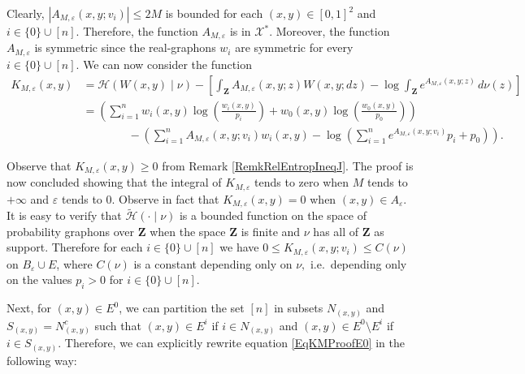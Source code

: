 \documentclass[12pt,twoside,a4paper]{article}
\newcommand{\Space}{\mathbf{Z}}
\newcommand{\Ugo}{\mathcal{X}^*}
\begin{document}
Clearly, $|A_{M,\varepsilon}(x,y;v_i)|\leq 2M$ is bounded for each $(x,y)\in [0,1]^2$ and $i\in \{0\}\cup [n].$  Therefore, the function $A_{M,\varepsilon}$ is in $\Ugo$. Moreover, the function $A_{M,\varepsilon}$ is symmetric since the real-graphons $w_i$ are symmetric for every $i\in \{0\}\cup [n].$ We can now consider the function 
\begin{equation}\label{EqKMProofE0}
\begin{aligned}
    K_{M,\varepsilon}(x,y) &= \mathcal{H}(W(x,y) \mid \nu) - \left[ \int_{\Space} A_{M,\varepsilon}(x,y;z) W(x,y;dz) - \log \int_\Space e^{A_{M,\varepsilon}(x,y;z)} \, d\nu(z) \right]\\
    &=\left(\sum^n_{i=1} w_i(x,y) \log \left(\frac{w_i(x,y)}{p_i}\right)+w_0(x,y)\log\left(\frac{w_0(x,y)}{p_0}\right)\right)\\
    &\qquad \qquad -\left(\sum^n_{i=1}A_{M,\varepsilon}(x,y;v_i)w_i(x,y)-\log(\sum^n_{i=1}e^{A_{M,\varepsilon}(x,y;v_i)}p_i+p_0)\right).
\end{aligned}
\end{equation}

Observe that $K_{M,\varepsilon}(x,y)\geq 0$ from Remark \ref{RemkRelEntropIneqJ}.
The proof is now concluded showing that the integral of $K_{M,\varepsilon}$ tends to zero when $M$ tends to $+\infty$ and $\varepsilon$ tends to $0.$ 
Observe in fact that $K_{M,\varepsilon}(x,y)=0$ when $(x,y)\in A_{\varepsilon}.$ It is easy to verify that $\widetilde{\mathcal{H}}(\cdot \mid \nu)$ is a bounded function on the space of probability graphons over $\Space$ when the space $\Space$ is finite and $\nu$ has all of $\Space$ as support. 
Therefore for each $i\in \{0\}\cup [n]$ we have $0 \leq K_{M,\varepsilon}(x,y;v_i) \leq C(\nu)$ on $B_{\varepsilon}\cup E$, where $C(\nu)$ is a constant depending only on $\nu,$ i.e.\ depending only on the values $p_i>0$ for $i\in \{0\}\cup [n].$ 

Next, for $(x,y) \in  E^0$, we can partition the set $ [n]$ in subsets $N_{(x,y)}$ and $S_{(x,y)}=N^c_{(x,y)}$ such that $(x,y) \in E^i$ if $i\in N_{(x,y)}$ and $(x,y) \in E^0\setminus E^i$ if $i\in S_{(x,y)}.$ Therefore, we can explicitly rewrite equation \eqref{EqKMProofE0} in the following way:
\end{document}
